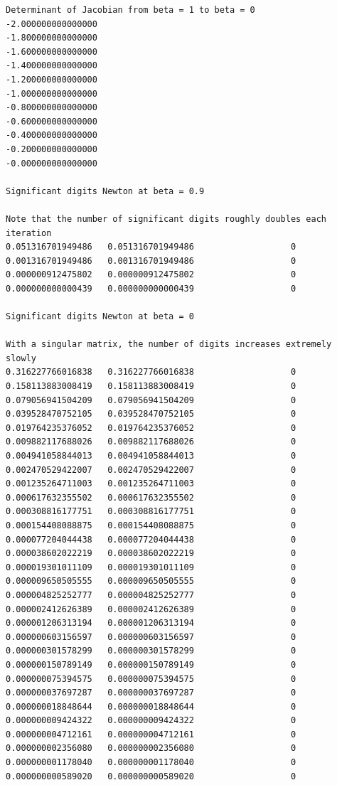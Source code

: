 \documentclass[11pt]{amsart}
\begin{document}
\begin{lstlisting}
Determinant of Jacobian from beta = 1 to beta = 0
-2.000000000000000
-1.800000000000000
-1.600000000000000
-1.400000000000000
-1.200000000000000
-1.000000000000000
-0.800000000000000
-0.600000000000000
-0.400000000000000
-0.200000000000000
-0.000000000000000

Significant digits Newton at beta = 0.9

Note that the number of significant digits roughly doubles each iteration
0.051316701949486   0.051316701949486                   0
0.001316701949486   0.001316701949486                   0
0.000000912475802   0.000000912475802                   0
0.000000000000439   0.000000000000439                   0

Significant digits Newton at beta = 0

With a singular matrix, the number of digits increases extremely slowly
0.316227766016838   0.316227766016838                   0
0.158113883008419   0.158113883008419                   0
0.079056941504209   0.079056941504209                   0
0.039528470752105   0.039528470752105                   0
0.019764235376052   0.019764235376052                   0
0.009882117688026   0.009882117688026                   0
0.004941058844013   0.004941058844013                   0
0.002470529422007   0.002470529422007                   0
0.001235264711003   0.001235264711003                   0
0.000617632355502   0.000617632355502                   0
0.000308816177751   0.000308816177751                   0
0.000154408088875   0.000154408088875                   0
0.000077204044438   0.000077204044438                   0
0.000038602022219   0.000038602022219                   0
0.000019301011109   0.000019301011109                   0
0.000009650505555   0.000009650505555                   0
0.000004825252777   0.000004825252777                   0
0.000002412626389   0.000002412626389                   0
0.000001206313194   0.000001206313194                   0
0.000000603156597   0.000000603156597                   0
0.000000301578299   0.000000301578299                   0
0.000000150789149   0.000000150789149                   0
0.000000075394575   0.000000075394575                   0
0.000000037697287   0.000000037697287                   0
0.000000018848644   0.000000018848644                   0
0.000000009424322   0.000000009424322                   0
0.000000004712161   0.000000004712161                   0
0.000000002356080   0.000000002356080                   0
0.000000001178040   0.000000001178040                   0
0.000000000589020   0.000000000589020                   0

\end{lstlisting}
\end{document}
